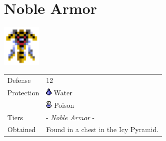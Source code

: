 \section{Noble Armor}
\label{armor:noble_armor}

\includegraphics[height=2cm,keepaspectratio]{./resources/armors/noblearmor}

\begin{longtable}{ l p{9cm} }
	Defense
	& 12
\\ %
	Protection
	& \includegraphics[height=1em,keepaspectratio]{./resources/effects/water}
	Water \\
	& \includegraphics[height=1em,keepaspectratio]{./resources/effects/poison}
	Poison
\\ %
	Tiers
	& \nameref{armor:steel_armor} - \textit{Noble Armor} - \nameref{armor:gaias_armor}
\\ %
	Obtained
	& Found in a chest in the Icy Pyramid.
\end{longtable}
